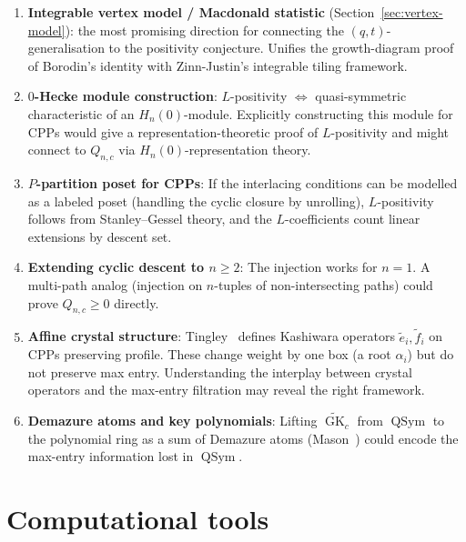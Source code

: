 \documentclass[11pt]{article}
\theoremstyle{plain}
\theoremstyle{definition}
\theoremstyle{remark}
\newcommand{\GK}{\operatorname{GK}}
\newcommand{\QSym}{\operatorname{QSym}}
\begin{document}
\begin{enumerate}
\item \textbf{Integrable vertex model / Macdonald statistic}
  (Section~\ref{sec:vertex-model}):
  the most promising direction for connecting the
  $(q,t)$-generalisation to the positivity conjecture.
  Unifies the growth-diagram proof of Borodin's identity
  with Zinn-Justin's integrable tiling framework.

\item \textbf{$0$-Hecke module construction}:
  $L$-positivity $\Leftrightarrow$ quasi-symmetric characteristic
  of an $H_n(0)$-module. Explicitly constructing this module
  for CPPs would give a representation-theoretic proof of
  $L$-positivity and might connect to $Q_{n,c}$ via
  $H_n(0)$-representation theory.

\item \textbf{$P$-partition poset for CPPs}:
  If the interlacing conditions can be modelled as a labeled
  poset (handling the cyclic closure by unrolling), $L$-positivity
  follows from Stanley--Gessel theory, and the $L$-coefficients
  count linear extensions by descent set.

\item \textbf{Extending cyclic descent to $n \geq 2$}:
  The injection works for $n = 1$. A multi-path analog
  (injection on $n$-tuples of non-intersecting paths)
  could prove $Q_{n,c} \geq 0$ directly.

\item \textbf{Affine crystal structure}:
  Tingley~\cite{tingley-2007} defines Kashiwara operators
  $\tilde{e}_i, \tilde{f}_i$ on CPPs preserving profile.
  These change weight by one box (a root $\alpha_i$) but
  do not preserve max entry. Understanding the interplay
  between crystal operators and the max-entry filtration
  may reveal the right framework.

\item \textbf{Demazure atoms and key polynomials}:
  Lifting $\widetilde{\GK}_c$ from $\QSym$ to the polynomial
  ring as a sum of Demazure atoms (Mason~\cite{mason-2009})
  could encode the max-entry information lost in $\QSym$.
\end{enumerate}


\section*{Computational tools}
\end{document}

